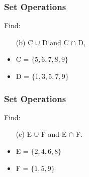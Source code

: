 \documentclass{beamer}
\begin{document}
\begin{frame}
\frametitle{Set Operations}
\Large
\vspace{-3cm}
Find: 
\begin{itemize}
\item[(b)] C $\cup$ D and C $\cap$ D,  \bigskip
\item C = $\{5, 6, 7, 8, 9\}$
\item D = $\{1, 3, 5, 7, 9\}$
\end{itemize}

\end{frame}
\begin{frame}
\frametitle{Set Operations}
\vspace{-3cm}
\Large
Find: 
\begin{itemize}
\item[(c)] E $\cup$ F and E $\cap$ F. \bigskip
\item E = $\{2, 4, 6, 8\}$

\item F = $\{1, 5, 9\}$
\end{itemize}

\end{frame}
\end{document}
